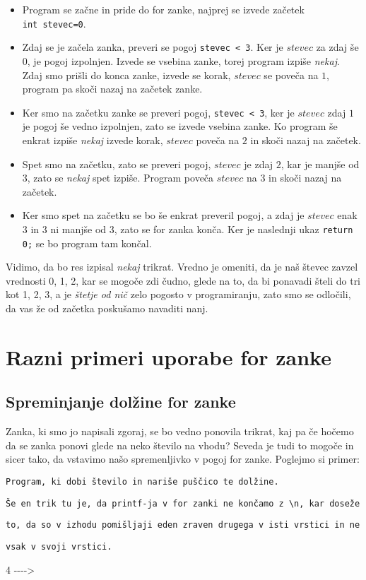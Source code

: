 \begin{itemize}
	\item Program se začne in pride do for zanke,
	najprej se izvede začetek \texttt{int~stevec=0}.
	\item Zdaj se je začela zanka, preveri se pogoj \texttt{stevec~<~3}.
	Ker je $stevec$ za zdaj še $0$, je pogoj izpolnjen. Izvede se vsebina zanke,
	torej program izpiše \emph{nekaj}. Zdaj smo prišli do konca zanke,
	izvede se korak, $stevec$ se poveča na $1$, program pa skoči nazaj na
	začetek zanke.
	\item Ker smo na začetku zanke se preveri pogoj, \texttt{stevec~<~3},
	ker je $stevec$ zdaj $1$ je pogoj še vedno izpolnjen, zato se izvede
	vsebina zanke. Ko program še enkrat izpiše \emph{nekaj} izvede korak,
	$stevec$ poveča na $2$ in skoči nazaj na začetek.
	\item Spet smo na začetku, zato se preveri pogoj, $stevec$ je zdaj $2$,
	kar je manjše od $3$, zato se \emph{nekaj} spet izpiše. Program poveča
	$stevec$ na $3$ in skoči nazaj na začetek.
	\item Ker smo spet na začetku se bo še enkrat preveril pogoj,
	a zdaj je $stevec$ enak $3$ in $3$ ni manjše od $3$,
	zato se for zanka konča. Ker je naslednji ukaz \texttt{return 0;} se bo
	program tam končal.
\end{itemize}

Vidimo, da bo res izpisal \emph{nekaj} trikrat. Vredno je omeniti,
da je naš števec zavzel vrednosti 0, 1, 2, kar se mogoče zdi čudno, glede na
to, da bi ponavadi šteli do tri kot 1, 2, 3, a je \emph{štetje od nič} zelo
pogosto v programiranju, zato smo se odločili, da vas že od začetka poskušamo
navaditi nanj.

\section{Razni primeri uporabe for zanke}

\subsection{Spreminjanje dolžine for zanke}
Zanka, ki smo jo napisali zgoraj, se bo vedno ponovila trikrat,
kaj pa če hočemo da se zanka ponovi glede na neko število na vhodu?
Seveda je tudi to mogoče in sicer tako, da vstavimo našo spremenljivko v pogoj
for zanke. Poglejmo si primer:

\begin{examples}
\verb+Program, ki dobi število in nariše puščico te dolžine.+

\verb+Še en trik tu je, da printf-ja v for zanki ne končamo z \n, kar doseže+

\verb+to, da so v izhodu pomišljaji eden zraven drugega v isti vrstici in ne+

\verb+vsak v svoji vrstici.+


\begin{inout}
	4
	\tcblower
	-{}-{}-{}->
\end{inout}

\end{examples}

